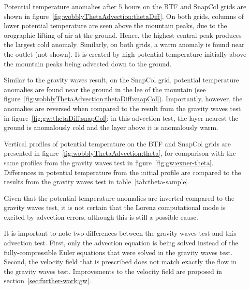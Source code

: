 Potential temperature anomalies after 5 hours on the BTF and SnapCol grids are shown in figure~\ref{fig:wobblyThetaAdvection:thetaDiff}.  On both grids, columns of lower potential temperature are seen above the mountain peaks, due to the orographic lifting of air at the ground.  Hence, the highest central peak produces the largest cold anomaly.  Similarly, on both grids, a warm anomaly is found near the outlet (not shown).  It is created by high potential temperature initially above the mountain peaks being advected down to the ground.

Similar to the gravity waves result, on the SnapCol grid, potential temperature anomalies are found near the ground in the lee of the mountain (see figure~\ref{fig:wobblyThetaAdvection:thetaDiff:snapCol}).  Importantly, however, the anomalies are reversed when compared to the result from the gravity waves test in figure~\ref{fig:gw:thetaDiff:snapCol}: in this advection test, the layer nearest the ground is anomalously cold and the layer above it is anomalously warm.  

Vertical profiles of potential temperature on the BTF and SnapCol grids are presented in figure~\ref{fig:wobblyThetaAdvection:theta}, for comparison with the same profiles from the gravity waves test in figure~\ref{fig:gw:exner-theta}.
Differences in potential temperature from the initial profile are compared to the results from the gravity waves test in table~\ref{tab:theta-sample}.

Given that the potential temperature anomalies are inverted compared to the gravity waves test, it is not certain that the Lorenz computational mode is excited by advection errors, although this is still a possible cause.

It is important to note two differences between the gravity waves test and this advection test.  First, only the advection equation is being solved instead of the fully-compressible Euler equations that were solved in the gravity waves test.  Second, the velocity field that is prescribed does not match exactly the flow in the gravity waves test.  Improvements to the velocity field are proposed in section~\ref{sec:further-work:gw}.

